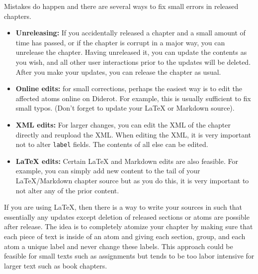 \begin{gram}
Mistakes do happen and there are several ways to fix small errors in released chapters.

\begin{itemize}
\item \textbf{Unreleasing:}
If you accidentally released a chapter and a small amount of time has passed, or if the chapter is corrupt in a major way, you can unrelease the chapter.
%
Having unreleased it, you can update the contents as you wish, and all other user interactions  prior to the updates will be deleted.
%
After you make your updates, you can release the chapter as usual.
%

\item \textbf{Online edits:}
for small corrections, perhaps the easiest way is to edit the affected atoms online on Diderot.  For example, this is usually sufficient to fix small typos.  (Don't forget to update your LaTeX or Markdown source).

\item \textbf{XML edits:}
%
For larger changes, you can edit the XML of the chapter directly and reupload the XML.  When editing the XML, it is very important not to alter \lstinline`label` fields.  The contents of all else can be edited.

\item \textbf{LaTeX edits:}
Certain LaTeX and Markdown edits are also feasible.  For example, you can simply add new content to the tail of your LaTeX/Markdown chapter source but as you do this, it is very important to not alter any of the prior content. 
\end{itemize}
\end{gram}

\begin{gram}
If you are using LaTeX, then there is a way to write your sources in such that essentially any updates except deletion of released sections or atoms are possible after release.  The idea is to completely atomize your chapter by making sure that each piece of text is inside of an atom and giving each section, group, and each atom a unique label and never change these labels.
%
This approach could be feasible for small texts such as assignments but tends to be too labor intensive for larger text such as book chapters.
\end{gram}



